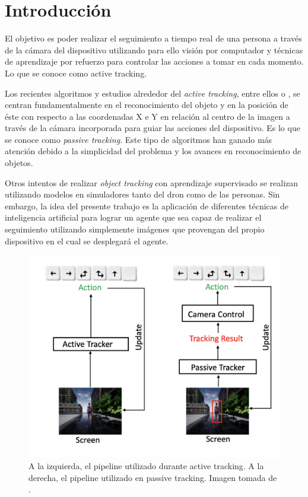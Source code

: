 
\cleardoublepage

\chapter{Introducción}
\label{introduccion}

El objetivo es poder realizar el seguimiento a tiempo real de una persona a través de la cámara del dispositivo utilizando para ello visión por computador y técnicas de aprendizaje por refuerzo para controlar las acciones a tomar en cada momento. Lo que se conoce como active tracking. 
\medskip

Los recientes algoritmos y estudios alrededor del \textit{active tracking}, entre ellos \citet{activetracking} o \citet{zhou2021space}, se centran fundamentalmente en el reconocimiento del objeto y en la posición de éste con respecto a las coordenadas X e Y en relación al centro de la imagen a través de la cámara incorporada para guiar las acciones del dispositivo. Es lo que se conoce como \textit{passive tracking}. Este tipo de algoritmos han ganado más atención debido a la simplicidad del problema y los avances en reconocimiento de objetos.
\medskip

Otros intentos de realizar \textit{object tracking} con aprendizaje supervisado se realizan utilizando modelos en simuladores tanto del dron como de las personas. Sin embargo, la idea del presente trabajo es la aplicación de diferentes técnicas de inteligencia artificial para lograr un agente que sea capaz de realizar el seguimiento utilizando simplemente imágenes que provengan del propio dispositivo en el cual se desplegará el agente.
\medskip

\begin{figure}[ht!]
\centering
\includegraphics[scale=0.4]{figuras/active_tracking_vs_passive_tracking.png}
\caption[A la izquierda, el pipeline utilizado durante active tracking. A la derecha, el pipeline utilizado en passive tracking.]{A la izquierda, el pipeline utilizado durante active tracking. A la derecha, el pipeline utilizado en passive tracking. Imagen tomada de \citet{luo2019end}.}
\label{fig-active-tracking}
\end{figure}
\medskip

